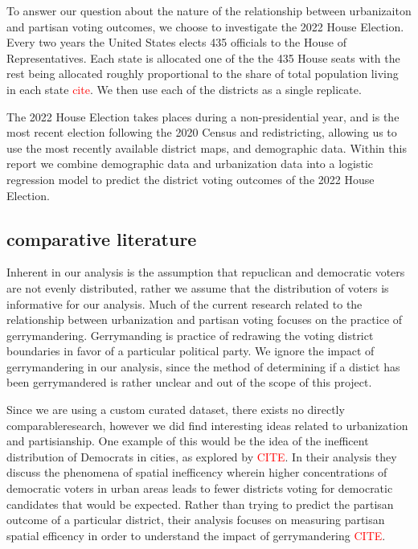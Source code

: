 \documentclass[12pt]{article}
\newcommand{\red}[1]{\textcolor{red}{#1}}
\begin{document}
To answer our question about the nature of the relationship between urbanizaiton and partisan voting outcomes, we choose to investigate the 2022 House Election. Every two years the United States elects 435 officials to the House of Representatives. Each state is allocated one of the the 435 House seats with the rest being allocated roughly proportional to the share of total population living in each state \red{cite}. We then use each of the districts as a single replicate. 

The 2022 House Election takes places during a non-presidential year, and is the most recent election following the 2020 Census and redistricting, allowing us to use the most recently available district maps, and demographic data. Within this report we combine demographic data and urbanization data into a logistic regression model to predict the district voting outcomes of the 2022 House Election. 


\subsection*{comparative literature}
Inherent in our analysis is the assumption that repuclican and democratic voters are not evenly distributed, rather we assume that the distribution of voters is informative for our analysis. Much of the current research related to the relationship between urbanization and partisan voting focuses on the practice of gerrymandering. Gerrymanding is practice of redrawing the voting district boundaries in favor of a particular political party. We ignore the impact of gerrymandering in our analysis, since the method of determining if a distict has been gerrymandered is rather unclear and out of the scope of this project.

Since we are using a custom curated dataset, there exists no directly comparableresearch, however we did find interesting ideas related to urbanization and partisianship. One example of this would be the idea of the inefficent distribution of Democrats in cities, as explored by \textcolor{red}{CITE}. In their analysis they discuss the phenomena of spatial inefficency wherein higher concentrations of democratic voters in urban areas leads to fewer districts voting for democratic candidates that would be expected. Rather than trying to predict the partisan outcome of a particular district, their analysis focuses on measuring partisan spatial efficency in order to understand the impact of gerrymandering \red{CITE}. 
\end{document}
